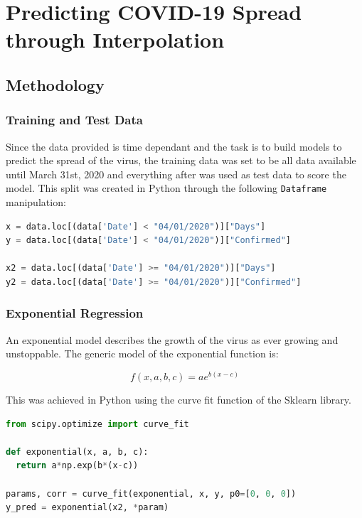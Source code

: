 \documentclass{homework}
\begin{document}
\newpage
\section{Predicting COVID-19 Spread through Interpolation}

\subsection{Methodology}

\subsubsection{Training and Test Data}

Since the data provided is time dependant and the task is to build models to predict the spread of the virus, the training data was set to be all data available until March 31st, 2020 and everything after was used as test data to score the model. This split was created in Python through the following \texttt{Dataframe} manipulation:

\begin{lstlisting}[language=Python, caption={Training and Test Data Split}, firstnumber=153]
x = data.loc[(data['Date'] < "04/01/2020")]["Days"]
y = data.loc[(data['Date'] < "04/01/2020")]["Confirmed"]

x2 = data.loc[(data['Date'] >= "04/01/2020")]["Days"]
y2 = data.loc[(data['Date'] >= "04/01/2020")]["Confirmed"]
\end{lstlisting}

\subsubsection{Exponential Regression}

An exponential model describes the growth of the virus as ever growing and unstoppable. The generic model of the exponential function is:

\begin{equation}
  f(x, a, b, c) = a e^{b(x-c)}
\end{equation}

This was achieved in Python using the curve fit function of the Sklearn library.

\begin{lstlisting}[language=Python, caption={Exponential Model}, firstnumber=149]
from scipy.optimize import curve_fit

def exponential(x, a, b, c):
  return a*np.exp(b*(x-c))

params, corr = curve_fit(exponential, x, y, p0=[0, 0, 0])
y_pred = exponential(x2, *param)
\end{lstlisting}
\end{document}
